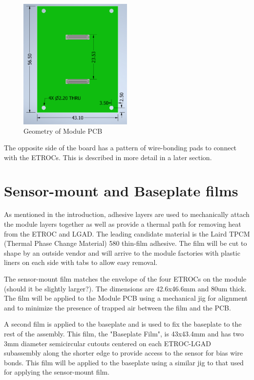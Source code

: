 \documentclass[10pt]{datasheet}
\begin{document}
\begin{figure}[h]
	\centering
	\includegraphics[width=0.5\textwidth,angle=-90]{figures/module_pcb.png}
	\caption{Geometry of Module PCB}
	\label{fig:module-pcb}	
\end{figure}

The opposite side of the board has a pattern of wire-bonding pads to connect with the ETROCs. This is described in more detail in a later section.


\section{Sensor-mount and Baseplate films}

As mentioned in the introduction, adhesive layers are used to mechanically attach the module layers together as well as provide a thermal path for removing heat from the ETROC and LGAD. The leading candidate material is the Laird TPCM (Thermal Phase Change Material) 580 thin-film adhesive. The film will be cut to shape by an outside vendor and will arrive to the module factories with plastic liners on each side with tabs to allow easy removal.

The sensor-mount film matches the envelope of the four ETROCs on the module (should it be slightly larger?). The dimensions are 42.6x46.6mm and 80um thick. The film will be applied to the Module PCB using a mechanical jig for alignment and to minimize the presence of trapped air between the film and the PCB.

A second film is applied to the baseplate and is used to fix the baseplate to the rest of the assembly. This film, the "Baseplate Film", is 43x43.4mm and has two 3mm diameter semicircular cutouts centered on each ETROC-LGAD subassembly along the shorter edge to provide access to the sensor for bias wire bonds. This film will be applied to the baseplate using a similar jig to that used for applying the sensor-mount film. 
\end{document}
